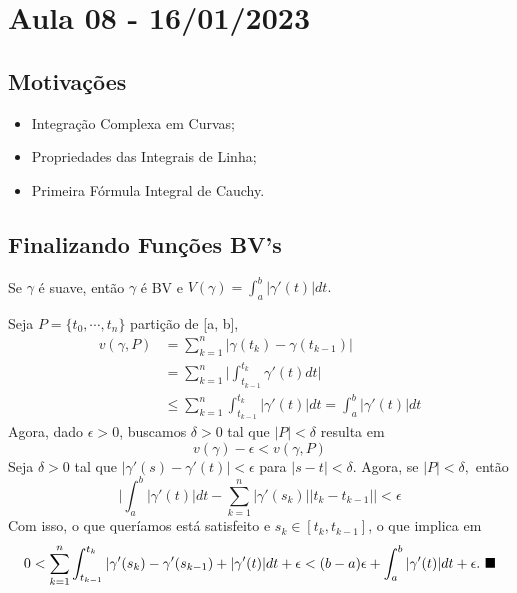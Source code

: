 \documentclass[ComplexAnalysis/complex.tex]{subfiles}
\begin{document}
\section{Aula 08 - 16/01/2023}
\subsection{Motivações}
\begin{itemize}
	\item Integração Complexa em Curvas;
	\item Propriedades das Integrais de Linha;
	\item Primeira Fórmula Integral de Cauchy.
\end{itemize}
\subsection{Finalizando Funções BV's}
\begin{prop*}
	Se $\gamma$ é suave, então $\gamma$ é BV e $V(\gamma) = \int_{a}^{b}|\gamma'(t)|dt.$
\end{prop*}
\begin{proof*}
	Seja $P=\{t_{0}, \cdots, t_n\} $ partição de [a, b],
	\begin{align*}
		v(\gamma, P) & = \sum\limits_{k=1}^{n}|\gamma(t_{k}) - \gamma(t_{k-1})|                                    \\
		             & = \sum\limits_{k=1}^{n}\biggl|\int_{t_{k-1}}^{t_{k}}\gamma'(t)dt\biggr|                     \\
		             & \leq \sum\limits_{k=1}^{n}\int_{t_{k-1}}^{t_{k}}|\gamma'(t)|dt = \int_{a}^{b}|\gamma'(t)|dt
	\end{align*}
	Agora, dado $\epsilon > 0$, buscamos $\delta > 0$ tal que $|P| < \delta$ resulta em
	$$
		v(\gamma) - \epsilon < v(\gamma, P)
	$$
	Seja $\delta > 0$ tal que $|\gamma'(s) - \gamma'(t)| < \epsilon$ para $|s - t| < \delta$. Agora, se $|P| < \delta,$ então
	$$
		\biggl|\int_{a}^{b}|\gamma'(t)|dt - \sum\limits_{k=1}^{n}|\gamma'(s_{k})||t_{k}-t_{k-1}|\biggr| < \epsilon
	$$
	Com isso, o que queríamos está satisfeito e $s_{k}\in{[t_{k}, t_{k-1}]}$, o que implica em
	$$
		0 < \sum\limits_{k=1}^{n}\int_{t_{k-1}}^{t_{k}}|\gamma'(s_{k}) - \gamma'(s_{k-1}) + |\gamma'(t)| dt + \epsilon < (b-a)\epsilon +
		\int_{a}^{b}|\gamma'(t)|dt + \epsilon. \text{ $\blacksquare$}
	$$
\end{proof*}
\end{document}
